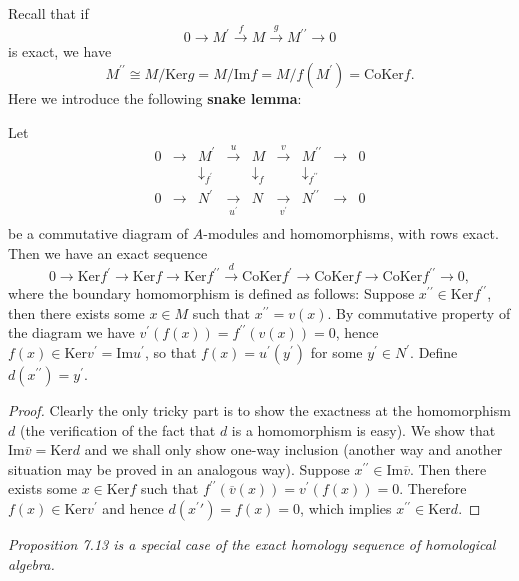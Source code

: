 Recall that if $$
0\longrightarrow M^{\prime}\overset{f}{\longrightarrow}M\overset{g}{\longrightarrow}M^{\prime\prime}\longrightarrow 0
$$
is exact, we have 
$$
M^{\prime\prime}\cong M/\mathrm{Ker}g=M/\mathrm{Im}f=M/f\left( M^{\prime} \right) =\mathrm{CoKer}f.
$$
Here we introduce the following \textbf{snake lemma}:
\begin{proposition}
Let 
$$
\begin{matrix}
	0&		\longrightarrow&		M^{\prime}&		\overset{u}{\longrightarrow}&		M&		\overset{v}{\longrightarrow}&		M^{\prime\prime}&		\longrightarrow&		0\\
	&		&		\downarrow _{f^{\prime}}&		&		\downarrow _f&		&		\downarrow _{f^{\prime\prime}}&		&		\\
	0&		\longrightarrow&		N^{\prime}&		\underset{u^{\prime}}{\longrightarrow}&		N&		\underset{v^{\prime}}{\longrightarrow}&		N^{\prime\prime}&		\longrightarrow&		0\\
\end{matrix}
$$
be a commutative diagram of $A$-modules and homomorphisms, with rows exact. Then we have an exact sequence 
$$
0\longrightarrow \mathrm{Ker}f^{\prime}\longrightarrow \mathrm{Ker}f\longrightarrow \mathrm{Ker}f^{\prime\prime}\overset{d}{\longrightarrow}\mathrm{CoKer}f^{\prime}\longrightarrow \mathrm{CoKer}f\longrightarrow \mathrm{CoKer}f^{\prime\prime}\longrightarrow 0,
$$
where the boundary homomorphism is defined as follows: Suppose $x^{\prime\prime}\in\mathrm{Ker}f^{\prime\prime}$, then there exists some $x\in M$ such that $x^{\prime\prime}=v(x)$. By commutative property of the diagram we have $v^\prime(f(x))=f^{\prime\prime}(v(x))=0$, hence $f(x)\in\mathrm{Ker}v^\prime=\mathrm{Im}u^\prime$, so that $f(x)=u^\prime(y^\prime)$ for some $y^\prime\in N^\prime$. Define $d(x^{\prime\prime})=y^\prime$.
\end{proposition}
\begin{proof}
Clearly the only tricky part is to show the exactness at the homomorphism $d$ (the verification of the fact that $d$ is a homomorphism is easy). We show that $\mathrm{Im}\overline{v}=\mathrm{Ker}d$ and we shall only show one-way inclusion (another way and another situation may be proved in an analogous way). Suppose $x^{\prime\prime}\in\mathrm{Im}\overline{v}$. Then there exists some $x\in\mathrm{Ker}f$ such that $f^{\prime\prime}(\overline{v}(x))=v^\prime(f(x))=0$. Therefore $f(x)\in\mathrm{Ker}v^\prime$ and hence $d(x^\prime\prime)=f(x)=0$, which implies $x^{\prime\prime}\in\mathrm{Ker}d$.
\end{proof}
\begin{note}\em
Proposition 7.13 is a special case of the exact homology sequence of homological algebra.
\end{note}
